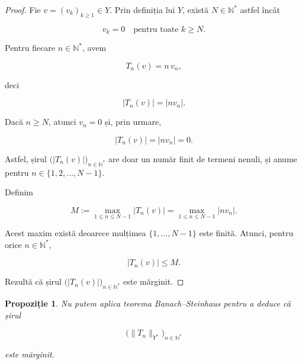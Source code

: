 \documentclass[12pt]{article}
\theoremstyle{definition}
\theoremstyle{plain}
\newtheorem{proposition}{Propoziție}
\begin{document}
\begin{proof}
Fie $v = (v_k)_{k\ge 1} \in Y$. Prin definiția lui $Y$, există $N \in \mathbb{N}^\ast$ astfel încât


\[
v_k = 0 \quad \text{pentru toate } k \ge N.
\]


Pentru fiecare $n \in \mathbb{N}^\ast$, avem


\[
T_n(v) = n\,v_n,
\]


deci


\[
|T_n(v)| = |n v_n|.
\]



Dacă $n \ge N$, atunci $v_n = 0$ și, prin urmare,


\[
|T_n(v)| = |n v_n| = 0.
\]


Astfel, șirul $\bigl(|T_n(v)|\bigr)_{n\in\mathbb{N}^\ast}$ are doar un număr finit de termeni nenuli, și anume pentru $n \in \{1,2,\dots,N-1\}$.

Definim


\[
M := \max_{1 \le n \le N-1} |T_n(v)| = \max_{1 \le n \le N-1} |n v_n|.
\]


Acest maxim există deoarece mulțimea $\{1,\dots,N-1\}$ este finită. Atunci, pentru orice $n \in \mathbb{N}^\ast$,


\[
|T_n(v)| \le M.
\]



Rezultă că șirul $\bigl(|T_n(v)|\bigr)_{n\in\mathbb{N}^\ast}$ este mărginit.
\end{proof}

\begin{proposition}
Nu putem aplica teorema Banach--Steinhaus pentru a deduce că șirul


\[
\bigl(\|T_n\|_{Y^*}\bigr)_{n\in\mathbb{N}^\ast}
\]


este mărginit.
\end{proposition}
\end{document}
